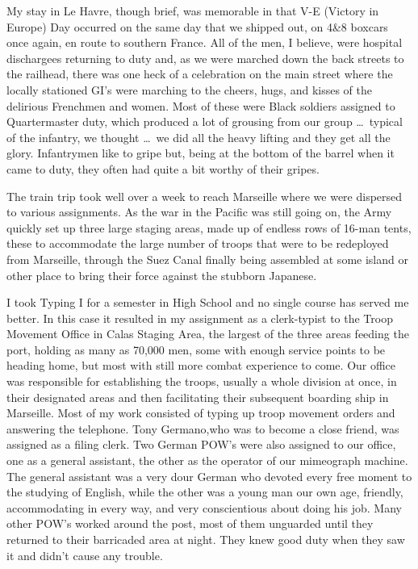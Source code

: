 \documentclass[../m3y]{subfiles}
\begin{document}
My stay in Le\thinspace{} Havre, though brief, was memorable in that V-E (Victory in Europe) Day occurred on the same day that we shipped out, on 4\&8 boxcars once again, en route to southern France. All of the men, I believe, were hospital dischargees returning to duty and, as we were marched down the back streets to the railhead, there was one heck of a celebration on the main street where the locally stationed GI's were marching to the cheers, hugs, and kisses of the delirious Frenchmen and women. Most of these were Black soldiers assigned to Quartermaster duty, which produced a lot of grousing from our group \ldots\ typical of the infantry, we thought \ldots\ we did all the heavy lifting and they get all the glory. Infantrymen like to gripe but, being at the bottom of the barrel when it came to duty, they often had quite a bit worthy of their gripes.

The train trip took well over a week to reach Marseille where we were dispersed to various assignments. As the war in the Pacific was still going on, the Army quickly set up three large staging areas, made up of endless rows of 16-man tents, these to accommodate the large number of troops that were to be redeployed from Marseille, through the Suez Canal finally being assembled at some island or other place to bring their force against the stubborn Japanese.

I took Typing I for a semester in High School and no single course has served me better. In this case it resulted in my assignment as a clerk-typist to the Troop Movement Office in Calas Staging Area, the largest of the three areas feeding the port, holding as many as 70,000 men, some with enough service points to be heading home, but most with still more combat experience to come. Our office was responsible for establishing the troops, usually a whole division at once, in their designated areas and then facilitating their subsequent boarding ship in Marseille. Most of my work consisted of typing up troop movement orders and answering the telephone. Tony Germano,who was to become a close friend, was assigned as a filing clerk. Two German POW's were also assigned to our office, one as a general assistant, the other as the operator of our mimeograph machine. The general assistant was a very dour German who devoted every free moment to the studying of English, while the other was a young man our own age, friendly, accommodating in every way, and very conscientious about doing his job. Many other POW's worked around the post, most of them unguarded until they returned to their barricaded area at night. They knew good duty when they saw it and didn't cause any trouble.
\end{document}
